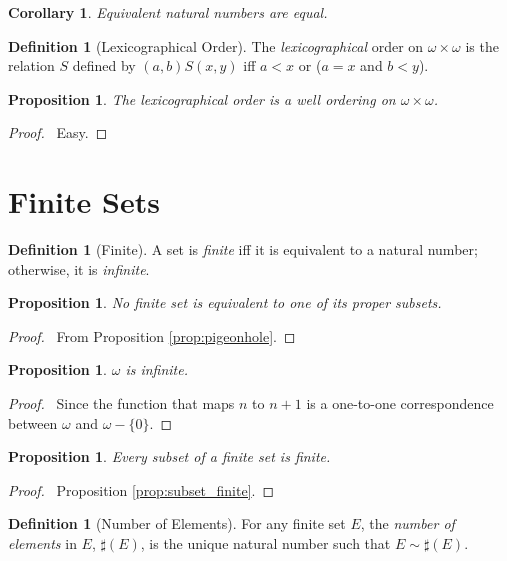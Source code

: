 \documentclass{report}
\let\qed\relax
\newtheorem{prop}[ax]{Proposition}
\newtheorem{cor}{Corollary}[ax]
\theoremstyle{definition}
\newtheorem{df}[ax]{Definition}
\begin{document}
\begin{cor}
Equivalent natural numbers are equal.
\end{cor}

\begin{df}[Lexicographical Order]
The \emph{lexicographical} order on $\omega \times \omega$ is the relation $S$ defined by $(a,b) S (x,y)$ iff $a < x$ or ($a = x$ and $b < y$).
\end{df}

\begin{prop}
The lexicographical order is a well ordering on $\omega \times \omega$.
\end{prop}

\begin{proof}
\pf\ Easy. \qed
\end{proof}

\section{Finite Sets}

\begin{df}[Finite]
A set is \emph{finite} iff it is equivalent to a natural number; otherwise, it is \emph{infinite}.
\end{df}

\begin{prop}
No finite set is equivalent to one of its proper subsets.
\end{prop}

\begin{proof}
\pf\ From Proposition \ref{prop:pigeonhole}. \qed
\end{proof}

\begin{prop}
$\omega$ is infinite.
\end{prop}

\begin{proof}
\pf\ Since the function that maps $n$ to $n+1$ is a one-to-one correspondence between $\omega$ and $\omega - \{0\}$. \qed
\end{proof}

\begin{prop}
Every subset of a finite set is finite.
\end{prop}

\begin{proof}
\pf\ Proposition \ref{prop:subset_finite}. \qed
\end{proof}

\begin{df}[Number of Elements]
For any finite set $E$, the \emph{number of elements} in $E$, $\sharp(E)$, is the unique natural number such that $E \sim \sharp(E)$.
\end{df}
\end{document}
